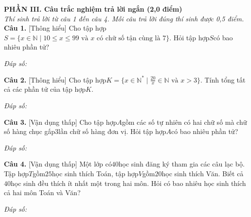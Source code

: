 \documentclass[11pt,a4paper]{article}
\begin{document}
\vspace{6pt}
\noindent
\textbf{\large PHẦN III. Câu trắc nghiệm trả lời ngắn (2,0 điểm)}\\
\textit{\small Thí sinh trả lời từ câu 1 đến câu 4. Mỗi câu trả lời đúng thí sinh được 0,5 điểm.}
\vspace{6pt}
\noindent\textbf{Câu 1.} [Thông hiểu] Cho tập hợp$S = \{x \in \mathbb{N} \mid 10 \le x \le 99 \text{ và } x \text{ có chữ số tận cùng là } 7\}$. Hỏi tập hợp$S$có bao nhiêu phần tử?\par\vspace{2pt}
\noindent\textit{Đáp số:} \dotfill\par\vspace{6pt}

\noindent\textbf{Câu 2.} [Thông hiểu] Cho tập hợp$K = \{x \in \mathbb{N}^* \mid \frac{20}{x} \in \mathbb{N}\text{ và } x > 3\}$. Tính tổng tất cả các phần tử của tập hợp$K$.\par\vspace{2pt}
\noindent\textit{Đáp số:} \dotfill\par\vspace{6pt}

\noindent\textbf{Câu 3.} [Vận dụng thấp] Cho tập hợp$A$gồm các số tự nhiên có hai chữ số mà chữ số hàng chục gấp$3$lần chữ số hàng đơn vị. Hỏi tập hợp$A$có bao nhiêu phần tử?\par\vspace{2pt}
\noindent\textit{Đáp số:} \dotfill\par\vspace{6pt}

\noindent\textbf{Câu 4.} [Vận dụng thấp] Một lớp có$40$học sinh đăng ký tham gia các câu lạc bộ. Tập hợp$T$gồm$25$học sinh thích Toán, tập hợp$V$gồm$20$học sinh thích Văn. Biết cả$40$học sinh đều thích ít nhất một trong hai môn. Hỏi có bao nhiêu học sinh thích cả hai môn Toán và Văn?\par\vspace{2pt}
\noindent\textit{Đáp số:} \dotfill\par\vspace{6pt}
\end{document}
